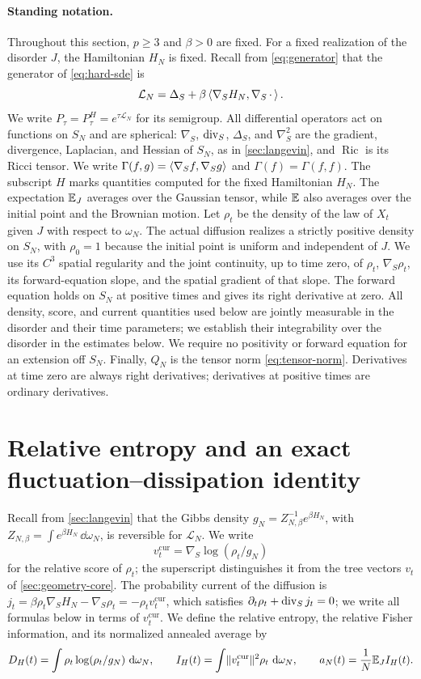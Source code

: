 \paragraph{Standing notation.}
Throughout this section, $p\ge3$ and $\beta>0$ are fixed. For a fixed realization of the disorder $J$, the Hamiltonian $H_N$ is fixed. Recall from \eqref{eq:generator} that the generator of \eqref{eq:hard-sde} is
\[
 \mathcal L_N=\Delta_S+\beta\left\langle\nabla_SH_N,\nabla_S\,\cdot\,\right\rangle.
\]
We write $P_\tau=P^H_\tau=e^{\tau\mathcal L_N}$ for its semigroup. All differential operators act on functions on $S_N$ and are spherical: $\nabla_S$, $\operatorname{div}_S$, $\Delta_S$, and $\nabla_S^2$ are the gradient, divergence, Laplacian, and Hessian of $S_N$, as in \cref{sec:langevin}, and $\operatorname{Ric}$ is its Ricci tensor. We write $\Gamma(f,g)=\left\langle\nabla_Sf,\nabla_Sg\right\rangle$ and $\Gamma(f)=\Gamma(f,f)$. The subscript $H$ marks quantities computed for the fixed Hamiltonian $H_N$. The expectation $\mathbb E_J$ averages over the Gaussian tensor, while $\mathbb E$ also averages over the initial point and the Brownian motion. Let $\rho_t$ be the density of the law of $X_t$ given $J$ with respect to $\omega_N$. The actual diffusion realizes a strictly positive density on $S_N$, with $\rho_0=1$ because the initial point is uniform and independent of $J$. We use its $C^3$ spatial regularity and the joint continuity, up to time zero, of $\rho_t$, $\nabla_S\rho_t$, its forward-equation slope, and the spatial gradient of that slope. The forward equation holds on $S_N$ at positive times and gives its right derivative at zero. All density, score, and current quantities used below are jointly measurable in the disorder and their time parameters; we establish their integrability over the disorder in the estimates below. We require no positivity or forward equation for an extension off $S_N$. Finally, $Q_N$ is the tensor norm \eqref{eq:tensor-norm}. Derivatives at time zero are always right derivatives; derivatives at positive times are ordinary derivatives.

\section{Relative entropy and an exact fluctuation--dissipation identity}\label{sec:entropy-fdt}

Recall from \cref{sec:langevin} that the Gibbs density $g_N=Z_{N,\beta}^{-1}e^{\beta H_N}$, with $Z_{N,\beta}=\int e^{\beta H_N}\,\dd\omega_N$, is reversible for $\mathcal L_N$. We write
\[
 v^{\mathrm{cur}}_t=\nabla_S\log(\rho_t/g_N)
\]
for the relative score of $\rho_t$; the superscript distinguishes it from the tree vectors $v_t$ of \cref{sec:geometry-core}. The probability current of the diffusion is $j_t=\beta\rho_t\nabla_SH_N-\nabla_S\rho_t=-\rho_tv^{\mathrm{cur}}_t$, which satisfies $\partial_t\rho_t+\operatorname{div}_Sj_t=0$; we write all formulas below in terms of $v^{\mathrm{cur}}_t$. We define the relative entropy, the relative Fisher information, and its normalized annealed average by
\[
 D_H(t)=\int\rho_t\log(\rho_t/g_N)\,\mathop{}\!\mathrm d\omega_N,
 \qquad
 I_H(t)=\int\lVert v^{\mathrm{cur}}_t\rVert^2\rho_t\,\mathop{}\!\mathrm d\omega_N,
 \qquad
 a_N(t)=\frac1N\mathbb E_J I_H(t).
\]

